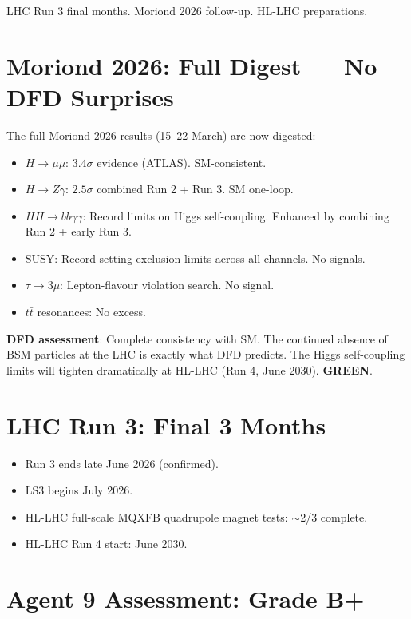 \documentclass[11pt,a4paper]{article}
\newcommand{\GREEN}{\textcolor{dfdgreen}{\textbf{GREEN}}}
\begin{document}
LHC Run 3 final months. Moriond 2026 follow-up. HL-LHC preparations.

\section{Moriond 2026: Full Digest --- No DFD Surprises}

\begin{tcolorbox}[colback=green!5!white, colframe=green!60!black,
  title={Moriond 2026 Complete: 45 Analyses, All SM-Consistent}]

The full Moriond 2026 results (15--22 March) are now digested:
\begin{itemize}
\item $H \to \mu\mu$: $3.4\sigma$ evidence (ATLAS). SM-consistent.
\item $H \to Z\gamma$: $2.5\sigma$ combined Run 2 + Run 3. SM one-loop.
\item $HH \to bb\gamma\gamma$: Record limits on Higgs self-coupling. Enhanced by combining Run 2 + early Run 3.
\item SUSY: Record-setting exclusion limits across all channels. No signals.
\item $\tau \to 3\mu$: Lepton-flavour violation search. No signal.
\item $t\bar{t}$ resonances: No excess.
\end{itemize}

\textbf{DFD assessment}: Complete consistency with SM. The continued absence of BSM particles at the LHC is exactly what DFD predicts. The Higgs self-coupling limits will tighten dramatically at HL-LHC (Run 4, June 2030). \GREEN.
\end{tcolorbox}

\section{LHC Run 3: Final 3 Months}

\begin{itemize}
\item Run 3 ends late June 2026 (confirmed).
\item LS3 begins July 2026.
\item HL-LHC full-scale MQXFB quadrupole magnet tests: $\sim$2/3 complete.
\item HL-LHC Run 4 start: June 2030.
\end{itemize}

\section{Agent 9 Assessment: Grade B+}
\end{document}
